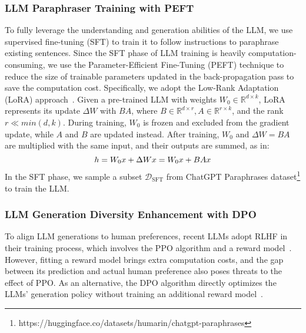 \subsubsection{LLM Paraphraser Training with PEFT} 
To fully leverage the understanding and generation abilities of the LLM, we use supervised fine-tuning (SFT) to train it to follow instructions to paraphrase existing sentences. 
Since the SFT phase of LLM training is heavily computation-consuming, we use the Parameter-Efficient Fine-Tuning (PEFT) technique to reduce the size of trainable parameters updated in the back-propagation pass to save the computation cost. 
Specifically, we adopt the Low-Rank Adaptation (LoRA) approach~\cite{hu2021lora}. 
Given a pre-trained LLM with weights \(W_0 \in  \mathbb{R}^{d \times k}\), LoRA represents its update \(\Delta W\) with \(BA\), where \(B \in \mathbb{R}^{d \times r}, A \in \mathbb{R}^{r \times k}\), and the rank \(r \ll min(d,k)\). 
During training, \(W_0\) is frozen and excluded from the gradient update, while \(A\) and \(B\) are updated instead. 
After training, \(W_0\) and \(\Delta W = BA\) are multiplied with the same input, and their outputs are summed, as in:
\vspace{-0.3cm}
\begin{equation}
    h = W_0 x + \Delta Wx = W_0 x + B A x
    \vspace{-0.15cm}
\end{equation}
In the SFT phase, we sample a subset \(\mathcal{D}_{\text{SFT}}\) from ChatGPT Paraphrases dataset\footnote{https://huggingface.co/datasets/humarin/chatgpt-paraphrases} to train the LLM. 


\subsubsection{LLM Generation Diversity Enhancement with DPO}

To align LLM generations to human preferences, recent LLMs adopt RLHF in their training process, which involves the PPO algorithm and a reward model~\cite{ouyang2022training,zhang2024prototypical}. 
However, fitting a reward model brings extra computation costs, and the gap between its prediction and actual human preference also poses threats to the effect of PPO. 
As an alternative, the DPO algorithm directly optimizes the LLMs' generation policy without training an additional reward model~\cite{rafailov2024direct}. 


